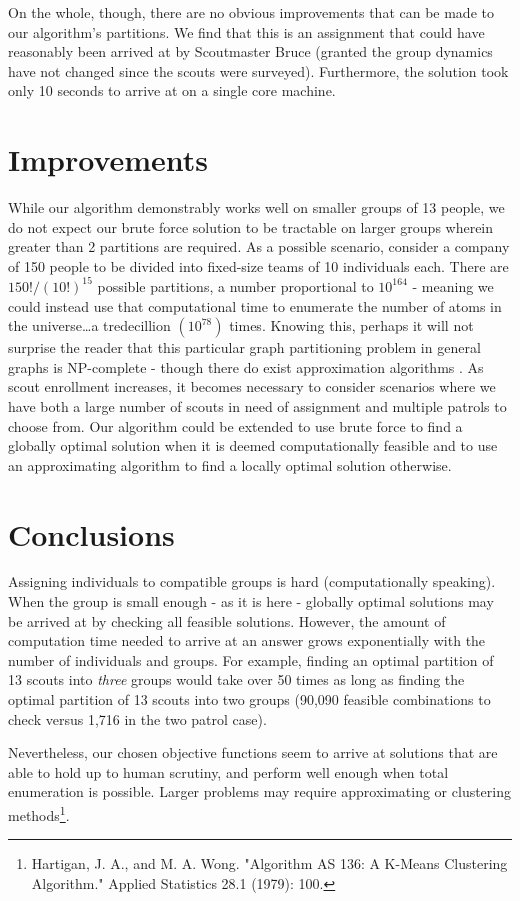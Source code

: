 \documentclass{amsart}
\theoremstyle{definition}
\theoremstyle{remark}
\numberwithin{equation}{section}
\begin{document}
On the whole, though, there are no obvious improvements that can be made to our algorithm's partitions. We find that this is an assignment that could have reasonably been arrived at by Scoutmaster Bruce (granted the group dynamics have not changed since the scouts were surveyed).  Furthermore, the solution took only 10 seconds to arrive at on a single core machine.

\section*{Improvements}
While our algorithm demonstrably works well on smaller groups of 13 people, we do not expect our brute force solution to be tractable on larger groups wherein greater than 2 partitions are required. As a possible scenario, consider a company of 150 people to be divided into fixed-size teams of 10 individuals each. There are $150! / (10!)^{15}$ possible partitions, a number proportional to $10^{164}$ - meaning we could instead use that computational time to enumerate the number of atoms in the universe\ldots a tredecillion $(10^{78})$ times. Knowing this, perhaps it will not surprise the reader that this particular graph partitioning problem in general graphs is NP-complete - though there do exist approximation algorithms \cite{A}.
As scout enrollment increases, it becomes necessary to consider scenarios where we have both a large number of scouts in need of assignment and multiple patrols to choose from. Our algorithm could be extended to use brute force to find a globally optimal solution when it is deemed computationally feasible and to use an approximating algorithm to find a locally optimal solution otherwise. 

\section*{Conclusions}
Assigning individuals to compatible groups is hard (computationally speaking). When the group is small enough - as it is here - globally optimal solutions may be arrived at by checking all feasible solutions. However, the amount of computation time needed to arrive at an answer grows exponentially with the number of individuals and groups. For example, finding an optimal partition of 13 scouts into \textit{three} groups would take over 50 times as long as finding the optimal partition of 13 scouts into two groups (90,090 feasible combinations to check versus 1,716 in the two patrol case).


Nevertheless, our chosen objective functions seem to arrive at solutions that are able to hold up to human scrutiny, and perform well enough when total enumeration is possible. Larger problems may require approximating or clustering methods\footnote{Hartigan, J. A., and M. A. Wong. "Algorithm AS 136: A K-Means Clustering Algorithm." Applied Statistics 28.1 (1979): 100.}. 
\end{document}

